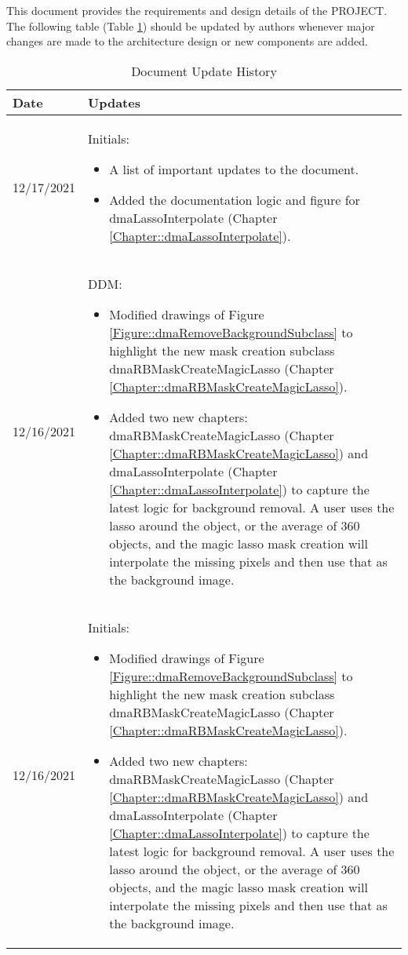 This document provides the requirements and design details of the
PROJECT.  The following table (Table \ref{Table::UpdateHistory}) should be
updated by authors whenever major changes are made to the architecture
design or new components are added.  

\begin{longtable}{|l||p{13.5cm}|}
\caption{Document Update History \label{Table::UpdateHistory}}\\
\hline
\textbf{Date} & \textbf{Updates} \\
\hline 
\endhead

12/17/2021 & Initials:
\begin{itemize}[topsep=0pt,itemsep=0pt,parsep=0pt,partopsep=0pt,leftmargin=12pt]
\item A list of important updates to the document.
\item Added the documentation logic and figure for dmaLassoInterpolate 
(Chapter \ref{Chapter::dmaLassoInterpolate}). 
\end{itemize} 
\\ \hline

12/16/2021 & DDM:
\begin{itemize}[topsep=0pt,itemsep=0pt,parsep=0pt,partopsep=0pt,leftmargin=12pt]
\item Modified drawings of Figure \ref{Figure::dmaRemoveBackgroundSubclass} to
highlight the new mask creation subclass dmaRBMaskCreateMagicLasso (Chapter 
\ref{Chapter::dmaRBMaskCreateMagicLasso}).
\item Added two new chapters: dmaRBMaskCreateMagicLasso
(Chapter \ref{Chapter::dmaRBMaskCreateMagicLasso}) and dmaLassoInterpolate
(Chapter \ref{Chapter::dmaLassoInterpolate}) to capture the latest logic for 
background removal.  A user uses the lasso around the object, or the average 
of 360 objects, and the magic lasso mask creation will interpolate the missing
pixels and then use that as the background image. 
\end{itemize} 
\\ \hline

12/16/2021 & Initials:
\begin{itemize}[topsep=0pt,itemsep=0pt,parsep=0pt,partopsep=0pt,leftmargin=12pt]
\item Modified drawings of Figure \ref{Figure::dmaRemoveBackgroundSubclass} to
highlight the new mask creation subclass dmaRBMaskCreateMagicLasso (Chapter 
\ref{Chapter::dmaRBMaskCreateMagicLasso}).
\item Added two new chapters: dmaRBMaskCreateMagicLasso
(Chapter \ref{Chapter::dmaRBMaskCreateMagicLasso}) and dmaLassoInterpolate
(Chapter \ref{Chapter::dmaLassoInterpolate}) to capture the latest logic for 
background removal.  A user uses the lasso around the object, or the average 
of 360 objects, and the magic lasso mask creation will interpolate the missing
pixels and then use that as the background image. 
\end{itemize} 
\\ \hline


\end{longtable}
